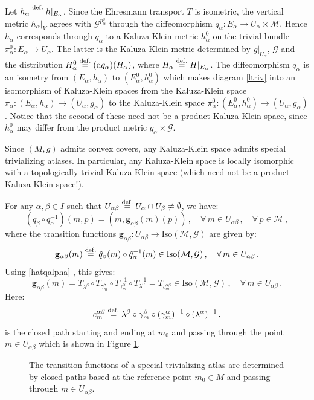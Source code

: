 \documentclass[10pt, cmp, numbook, final, a4paper]{svjour}
\newcommand*{\SavedEqref}{}
\let\SavedEqref\eqref
\renewcommand*{\eqref}[1]{%
  \begingroup
    \hypersetup{
      linkcolor=blue,
      linkbordercolor=blue,
    }%
    \SavedEqref{#1}%
  \endgroup
}
\newcommand{\eqdef}{\stackrel{{\rm def.}}{=}}
\def\dd{\mathrm{d}}
\newcommand{\be}{\begin{equation*}}
\newcommand{\ee}{\end{equation*}}
\newcommand{\ben}{\begin{equation}}
\newcommand{\een}{\end{equation}}
\newcommand{\cM}{\mathcal{M}}
\def\cG{\mathcal{G}}
\def\bg{\mathbf{g}}
\def\bg{\mathbf{g}}
\def\Iso{\mathrm{Iso}}
\begin{document}
Let $h_{\alpha}\eqdef h|_{E_{\alpha}}$. Since the Ehresmann transport
$T$ is isometric, the vertical metric $h_\alpha|_{V}$ agrees with
$\cG^{p^0_{\alpha}}$ through the diffeomorphism $q_\alpha\colon
E_{\alpha}\rightarrow U_\alpha\times \cM$. Hence $h_\alpha$
corresponds through $q_\alpha$ to a Kaluza-Klein metric
$h^{0}_{\alpha}$ on the trivial bundle
$\pi^0_{\alpha}:E_{\alpha}\rightarrow U_\alpha$. The latter is the
Kaluza-Klein metric determined by $g|_{U_\alpha}$, $\cG$ and the
distribution $H^{0}_{\alpha} \eqdef (\dd q_\alpha)(H_\alpha)$, where
$H_\alpha\eqdef H|_{E_\alpha}$. The diffeomorphism $q_\alpha$ is an
isometry from $(E_\alpha,h_\alpha)$ to $(E^0_{\alpha},
h^{0}_{\alpha})$ which makes diagram \eqref{ltriv} into an isomorphism
of Kaluza-Klein spaces from the Kaluza-Klein space
$\pi_\alpha:(E_\alpha,h_\alpha)\rightarrow (U_\alpha,g_\alpha)$ to the
Kaluza-Klein space $\pi^0_{\alpha}\colon
(E^0_{\alpha},h^{0}_{\alpha})\rightarrow (U_\alpha,g_\alpha)$. Notice
that the second of these need not be a product Kaluza-Klein space,
since $h^{0}_{\alpha}$ may differ from the product metric
$g_\alpha\times \cG$.
	
Since $(M,g)$ admits convex covers, any Kaluza-Klein space admits
special trivializing atlases. In particular, any Kaluza-Klein space is
locally isomorphic with a topologically trivial Kaluza-Klein space
(which need not be a product Kaluza-Klein space!).
	
For any $\alpha,\beta\in I$ such that $U_{\alpha\beta}\eqdef
U_\alpha\cap U_\beta\neq \emptyset$, we have:
\be
(q_\beta\circ q_\alpha^{-1})(m,p)=(m, \bg_{\alpha\beta}(m)(p))\, , \quad \forall\, m\in U_{\alpha\beta}\, , \quad \forall\, p\in \cM\, ,
\ee
where the transition functions $\bg_{\alpha\beta}:U_{\alpha\beta}\rightarrow \Iso(\cM,\cG)$ are given by:
\ben
\label{bgdef}
\bg_{\alpha\beta}(m)\eqdef {\hat q}_\beta(m)\circ {\hat q}^{-1}_\alpha(m)\in \Iso(\cM,\cG)\, , \quad \forall\, m\in U_{\alpha\beta}\, .
\een
Using \eqref{hatqalpha}, this gives:
\be
\bg_{\alpha\beta}(m)=T_{\lambda^{\beta}}\circ T_{\gamma^{\beta}_{m}}\circ T_{\gamma^{\alpha}_{m}}^{-1}\circ T_{\lambda^{\alpha}}^{-1}=
T_{c^{\alpha\beta}_m}\in \Iso(\cM,\cG)\, , \quad \forall\, m\in U_{\alpha\beta}\, .
\ee
Here: 
\ben
\label{calphabeta}
c^{\alpha\beta}_m\eqdef
\lambda^{\beta}\circ\gamma^{\beta}_{m}\circ (\gamma^{\alpha}_{m})^{-1}\circ (\lambda^{\alpha})^{-1}\, ,
\een 
is the closed path starting and ending at $m_0$ and passing through the
point $m\in U_{\alpha\beta}$ which is shown in
Figure \ref{fig:specialtriv}.
\begin{figure}[h]
\centering
\scalebox{0.4}{}
\caption{The transition functions of a special trivializing atlas are
  determined by closed paths based at the reference point $m_0\in M$
  and passing through $m\in U_{\alpha\beta}$.}
\label{fig:specialtriv}
\end{figure}
\end{document}
